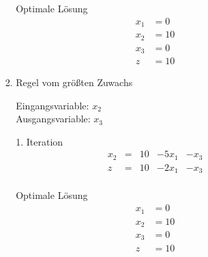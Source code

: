 \documentclass[a4paper]{scrartcl}
\begin{document}
\begin{enumerate}
\begin{enumerate}
\begin{enumerate}[(i)]
\begin{enumerate}
                                Optimale Lösung
                                \begin{align*}
                                    x_1 &= 0 \\
                                    x_2 &= 10 \\
                                    x_3 &= 0 \\
                                    z   &= 10
                                \end{align*}

                            \item Regel vom größten Zuwachs

                                Eingangsvariable: $x_2$ \\
                                Ausgangsvariable: $x_3$

                                1. Iteration
                                \begin{equation}
                                    \begin{array}{rcrrr}
                                        x_2 & = & 10 & -5x_1 & -x_3  \\
                                        \hline                    
                                        z   & = & 10 & -2x_1 & -x_3  \\
                                    \end{array}
                                \end{equation}

                                Optimale Lösung
                                \begin{align*}
                                    x_1 &= 0 \\
                                    x_2 &= 10 \\
                                    x_3 &= 0 \\
                                    z   &= 10
                                \end{align*}

                        \end{enumerate}


\end{enumerate}
\end{enumerate}
\end{enumerate}
\end{document}
